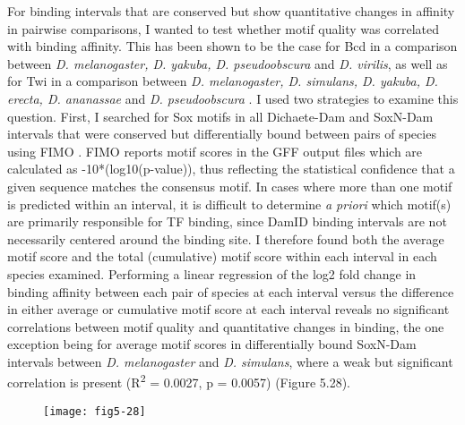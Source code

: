 For binding intervals that are conserved but show quantitative changes in affinity in pairwise comparisons, I wanted to test whether motif quality was correlated with binding affinity. This has been shown to be the case for Bcd in a comparison between \emph{D. melanogaster, D. yakuba, D. pseudoobscura} and \emph{D. virilis}, as well as for Twi in a comparison between \emph{D. melanogaster, D. simulans, D. yakuba, D. erecta, D. ananassae} and \emph{D. pseudoobscura} \citep{he_high_2011,paris_extensive_2013}. I used two strategies to examine this question. First, I searched for Sox motifs in all Dichaete-Dam and SoxN-Dam intervals that were conserved but differentially bound between pairs of species using FIMO \citep{grant_fimo:_2011}. FIMO reports motif scores in the GFF output files which are calculated as -10*(log10(p-value)), thus reflecting the statistical confidence that a given sequence matches the consensus motif. In cases where more than one motif is predicted within an interval, it is difficult to determine \emph{a priori} which motif(s) are primarily responsible for TF binding, since DamID binding intervals are not necessarily centered around the binding site. I therefore found both the average motif score and the total (cumulative) motif score within each interval in each species examined. Performing a linear regression of the log2 fold change in binding affinity between each pair of species at each interval versus the difference in either average or cumulative motif score at each interval reveals no significant correlations between motif quality and quantitative changes in binding, the one exception being for average motif scores in differentially bound SoxN-Dam intervals between \emph{D. melanogaster} and \emph{D. simulans}, where a weak but significant correlation is present (R\textsuperscript{2} = 0.0027, p = 0.0057) (Figure 5.28).

\begin{figure}[H]
\centering
\texttt{[image: fig5-28]}
\label{Figure 5.28}
\end{figure}

